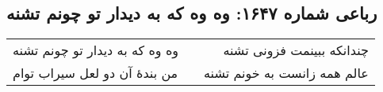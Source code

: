 \begin{center}
\section*{رباعی شماره ۱۶۴۷: وه وه که به دیدار تو چونم تشنه}
\label{sec:1647}
\begin{longtable}{l p{0.5cm} r}
وه وه که به دیدار تو چونم تشنه
&&
چندانکه ببینمت فزونی تشنه
\\
من بندهٔ آن دو لعل سیراب توام
&&
عالم همه زانست به خونم تشنه
\\
\end{longtable}
\end{center}
